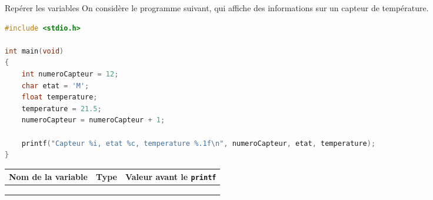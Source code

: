 \begin{UPSTIexercice}{Repérer les variables}
    On considère le programme suivant, qui affiche des informations sur un capteur de température.
    \begin{lstlisting}[language=C]
#include <stdio.h>

int main(void)
{
    int numeroCapteur = 12;
    char etat = 'M';
    float temperature;
    temperature = 21.5;
    numeroCapteur = numeroCapteur + 1;

    printf("Capteur %i, etat %c, temperature %.1f\n", numeroCapteur, etat, temperature);
}
    \end{lstlisting}

    \begin{center}
        \begin{tabular}{|l|l|l|}
            \hline
            \textbf{Nom de la variable} & \textbf{Type} & \textbf{Valeur avant le \texttt{printf}} \\
            \hline
             &  &  \\[0.6cm]
            \hline
             &  &  \\[0.6cm]
            \hline
             &  &  \\[0.6cm]
            \hline
        \end{tabular}
    \end{center}
\end{UPSTIexercice}

